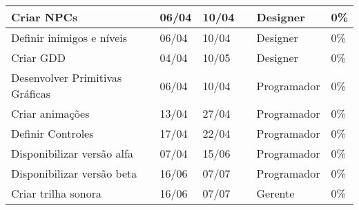 \documentclass[a4paper, 11pt]{article} %
\begin{document}
\begin{table}[h]
\begin{tabular}{|l|l|l|l|l|l|}
Criar NPCs                                   & 06/04                                & 10/04                             &                                         & Designer                                  & 0\%                                     \\ \hline
Definir inimigos e níveis                    & 06/04                                & 10/04                             &                                         & Designer                                  & 0\%                                     \\ \hline
Criar GDD                                    & 04/04                                & 10/05                             &                                         & Designer                                  & 0\%                                     \\ \hline
Desenvolver Primitivas Gráficas              & 06/04                                & 10/04                             &                                         & Programador                               & 0\%                                     \\ \hline
Criar animações                              & 13/04                                & 27/04                             &                                         & Programador                               & 0\%                                     \\ \hline
Definir Controles                            & 17/04                                & 22/04                             &                                         & Programador                               & 0\%                                     \\ \hline
Disponibilizar versão alfa                   & 07/04                                & 15/06                             &                                         & Programador                               & 0\%                                     \\ \hline
Disponibilizar versão beta                   & 16/06                                & 07/07                             &                                         & Programador                               & 0\%                                     \\ \hline
Criar trilha sonora                          & 16/06                                & 07/07                             &                                         & Gerente                                   & 0\%                                     \\ \hline

\end{tabular}
\end{table}
\end{document}
